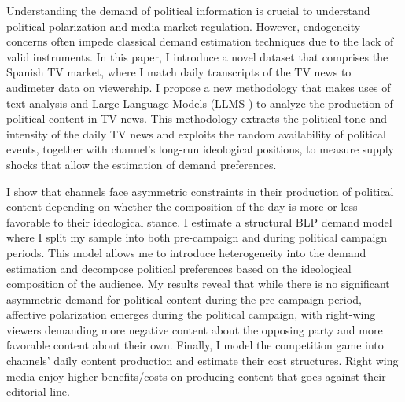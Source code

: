 \documentclass[12pt]{article}
\begin{document}
	Understanding the demand of political information is crucial to understand political polarization and media market regulation. However, endogeneity concerns often  impede classical demand estimation techniques due to the lack of valid instruments. In this paper,  I introduce a novel dataset that comprises the Spanish TV market, where I match daily transcripts of the TV news to audimeter data on viewership. I propose a new methodology that makes uses of text analysis and Large Language Models (LLMS ) to analyze the production of political content in TV news. This methodology extracts the political tone and intensity of the daily TV news and  exploits the random availability of political events, together with channel's long-run ideological positions, to measure supply shocks that allow the estimation of  demand preferences.
	
	I show that channels face asymmetric constraints  in their production of political content depending on whether the composition of the day is more or less favorable to their ideological stance. I estimate a structural BLP demand model where I split my sample into both pre-campaign and during political campaign periods. This model allows me to introduce heterogeneity into the demand estimation and decompose political preferences based on the  ideological composition of the audience. My results reveal that while there is no significant asymmetric demand for political content during the pre-campaign period, affective polarization emerges during the political campaign, with right-wing viewers demanding more negative content about the opposing party and more favorable content about their own. Finally, I model the competition game into channels' daily content production and estimate their cost structures. Right wing media enjoy higher benefits/costs on producing content that goes against their editorial line.
	
	
	
	
	
	
	\clearpage
	
	\pagestyle{plain}  
	
	
	
	
	
	
	\clearpage

\appendix

\end{document}
